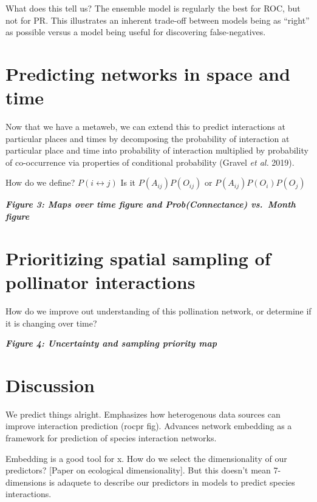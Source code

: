 \documentclass[11pt]{article}
\begin{document}
What does this tell us? The ensemble model is regularly the best for
ROC, but not for PR. This illustrates an inherent trade-off between
models being as ``right'' as possible versus a model being useful for
discovering false-negatives.

\hypertarget{predicting-networks-in-space-and-time}{%
\section{Predicting networks in space and
time}\label{predicting-networks-in-space-and-time}}

Now that we have a metaweb, we can extend this to predict interactions
at particular places and times by decomposing the probability of
interaction at particular place and time into probability of interaction
multiplied by probability of co-occurrence via properties of conditional
probability (Gravel \emph{et al.} 2019).

How do we define? \(P(i \leftrightarrow j)\) Is it
\(P(A_{ij})P(O_{ij})\) or \(P(A_{ij})P(O_i)P(O_j)\)

\textbf{\emph{Figure 3: Maps over time figure and Prob(Connectance)
vs.~Month figure}}

\hypertarget{prioritizing-spatial-sampling-of-pollinator-interactions}{%
\section{Prioritizing spatial sampling of pollinator
interactions}\label{prioritizing-spatial-sampling-of-pollinator-interactions}}

How do we improve out understanding of this pollination network, or
determine if it is changing over time?

\textbf{\emph{Figure 4: Uncertainty and sampling priority map}}

\hypertarget{discussion}{%
\section{Discussion}\label{discussion}}

We predict things alright. Emphasizes how heterogenous data sources can
improve interaction prediction (rocpr fig). Advances network embedding
as a framework for prediction of species interaction networks.

Embedding is a good tool for x. How do we select the dimensionality of
our predictors? {[}Paper on ecological dimensionality{]}. But this
doesn't mean 7-dimensions is adaquete to describe our predictors in
models to predict species interactions.
\end{document}
